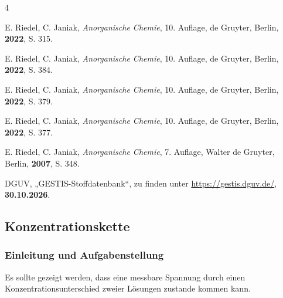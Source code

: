 \documentclass[
	a4paper,										%
	12pt,											%
	twoside,										%
	headsepline,								%
	footsepline,									%
	captions=tableheading,					%
]{scrartcl}
\begin{document}
\begin{thebibliography}{4} %

						{E. Riedel, C. Janiak}, 
			\textit	{Anorganische Chemie}, 
						{10. Auflage}, 
						{de Gruyter}, 
						{Berlin}, 
			\textbf	{2022}, 
			S.			{315}.

						{E. Riedel, C. Janiak}, 
			\textit	{Anorganische Chemie}, 
						{10. Auflage}, 
						{de Gruyter}, 
						{Berlin}, 
			\textbf	{2022}, 
			S.			{384}.

						{E. Riedel, C. Janiak}, 
			\textit	{Anorganische Chemie}, 
						{10. Auflage}, 
						{de Gruyter}, 
						{Berlin}, 
			\textbf	{2022}, 
			S.			{379}.

						{E. Riedel, C. Janiak}, 
			\textit	{Anorganische Chemie}, 
						{10. Auflage}, 
						{de Gruyter}, 
						{Berlin}, 
			\textbf	{2022}, 
			S.			{377}.
	
						{E. Riedel, C. Janiak}, 
			\textit	{Anorganische Chemie}, 
						{7. Auflage}, 
						{Walter de Gruyter}, 
						{Berlin}, 
			\textbf	{2007}, 
			S.			{348}.

						{DGUV}, 
						„{GESTIS-Stoffdatenbank}“, zu finden unter 
			\url		{https://gestis.dguv.de/}, 
			\textbf	{30.10.2026}.

			
\end{thebibliography}

\newpage

\setcounter{subsection}{1}							%
\setcounter{secnumdepth}{4}
	
\subsection{Konzentrationskette}

\subsubsection{Einleitung und Aufgabenstellung}
Es sollte gezeigt werden, dass eine messbare Spannung durch einen Konzentrationsunterschied zweier Lösungen zustande kommen kann.
\end{document}
